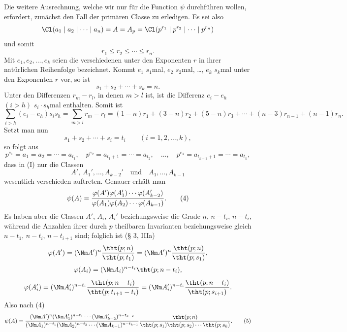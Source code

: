 Die weitere Ausrechnung, welche wir nur für die Function $\psi$ durchführen wollen, erfordert, zunächst den Fall der primären Classe zu erledigen. Es sei also
\[
 \Cl(a_1\mid a_2\mid\cdots\mid a_n)=A=A_p=
 \Cl(p^{r_1}\mid p^{r_2}\mid\cdots\mid p^{r_n})
\]
und somit
\[
 r_1\le r_2\le\cdots\le r_n.
\]
Mit $e_1,e_2,\ldots,e_k$ seien die verschiedenen unter den Exponenten $r$ in ihrer natürlichen Reihenfolge bezeichnet. Kommt $e_1$ $s_1$mal, $e_2$ $s_2$mal, \ldots, $e_k$ $s_k$mal unter den Exponenten $r$ vor, so ist
\begin{equation}
 s_1+s_2+\cdots+s_k=n.
\tag{1}
\end{equation}
Unter den Differenzen $r_m-r_l$, in denen $m>l$ ist, ist die Differenz $e_i-e_h$ $(i>h)$ $s_i\cdot s_h$mal enthalten. Somit ist
\begin{equation}
 \sum_{i>h}(e_i-e_h)s_i s_h=\sum_{m>l}r_m-r_l
 =(1-n)r_1+(3-n)r_2+(5-n)r_3+\cdots+(n-3)r_{n-1}+(n-1)r_n.
\tag{2}
\end{equation}
Setzt man nun
\[
 s_1+s_2+\cdots+s_i=t_i\qquad (i=1,2,\ldots,k),
\]
so folgt aus
\begin{equation}
 p^{e_1}=a_1=a_2=\cdots=a_{t_1},\quad
 p^{e_2}=a_{t_1+1}=\cdots=a_{t_2},\quad\ldots,\quad
 p^{e_k}=a_{t_{k-1}+1}=\cdots=a_{t_k},
\tag{3}
\end{equation}
dass in (I) nur die Classen
\[
 A',\ A_1',\ldots,A_{k-2}'
\quad\text{und}\quad
 A_1,\ldots,A_{k-1}
\]
wesentlich verschieden auftreten. Genauer erhält man
\begin{equation}
 \psi(A)=
 {\varphi(A')\varphi(A_1')\cdots\varphi(A_{k-2}')
 \over
 \varphi(A_1)\varphi(A_2)\cdots\varphi(A_{k-1})}.
\tag{4}
\end{equation}
Es haben aber die Classen $A'$, $A_i$, $A_i'$ beziehungsweise die Grade $n$, $n-t_i$, $n-t_i$, während die Anzahlen ihrer durch $p$ theilbaren Invarianten beziehungsweise gleich $n-t_1$, $n-t_i$, $n-t_{i+1}$ sind; folglich ist (§ 3, IIIa)
\[
 \varphi(A')=(\Nm A')^n {\tht(p;n)\over\tht(p;t_1)}=(\Nm A')^n {\tht(p;n)\over\tht(p;s_1)},
\]
\[
 \varphi(A_i)=(\Nm A_i)^{n-t_i}\tht(p;n-t_i),
\]
\[
 \varphi(A_i')=(\Nm A_i')^{n-t_i}
 {\tht(p;n-t_i)\over\tht(p;t_{i+1}-t_i)}
 = (\Nm A_i')^{n-t_i}{\tht(p;n-t_i)\over\tht(p;s_{i+1})}.
\]
Also nach (4)
\begin{equation}
 \psi(A)=
 { (\Nm A')^n(\Nm A_1')^{n-t_1}\cdots(\Nm A_{k-2}')^{n-t_{k-2}}
 \over
 (\Nm A_1)^{n-t_1}(\Nm A_2)^{n-t_2}\cdots(\Nm A_{k-1})^{n-t_{k-1}} }
 {\tht(p;n)\over\tht(p;s_1)\tht(p;s_2)\cdots\tht(p;s_k)}.
\tag{5}
\end{equation}
